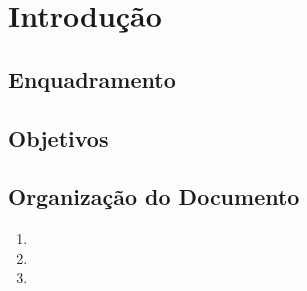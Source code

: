\chapter{Introdução}
\label{chap:intro}

\section{Enquadramento}
\label{sec:amb} 



\section{Objetivos}
\label{sec:obj}

\section{Organização do Documento}
\label{sec:organ}
\begin{enumerate}
\item 
\item 
\item 
\end{enumerate}
